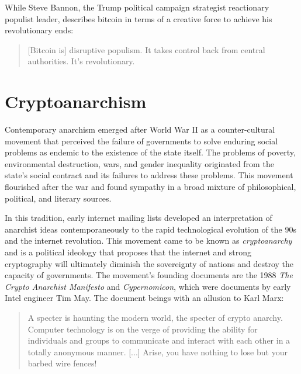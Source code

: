 While Steve Bannon, the Trump political campaign strategist reactionary populist
leader, describes bitcoin in terms of a creative force to achieve his
revolutionary ends:


\begin{quote}
[Bitcoin is] disruptive populism. It takes control back from central authorities.
It's revolutionary.
\end{quote}

\section{Cryptoanarchism}


Contemporary anarchism emerged after World War II as a counter-cultural movement
that perceived the failure of governments to solve enduring social problems as
endemic to the existence of the state itself. The problems of poverty,
environmental destruction, wars, and gender inequality originated from the
state's social contract and its failures to address these problems. This
movement flourished after the war and found sympathy in a broad mixture of
philosophical, political, and literary sources.

In this tradition, early internet mailing lists developed an interpretation of
anarchist ideas contemporaneously to the rapid technological evolution of the
90s and the internet revolution. This movement came to be known as
\textit{cryptoanarchy} and is a political ideology that proposes that the
internet and strong cryptography will ultimately diminish the sovereignty of
nations and destroy the capacity of governments. The movement's founding
documents are the 1988 \textit{The Crypto Anarchist Manifesto} and
\textit{Cypernomicon}, which were documents by early Intel engineer Tim May. The
document beings with an allusion to Karl Marx:


\begin{quote}
A specter is haunting the modern world, the specter of crypto anarchy.
Computer technology is on the verge of providing the ability for
individuals and groups to communicate and interact with each other in a
totally anonymous manner. [...] Arise, you have nothing to lose
but your barbed wire fences!
\end{quote}

